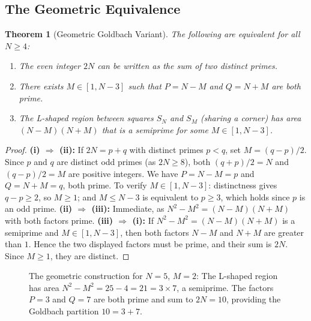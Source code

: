 \documentclass[11pt]{amsart}
\newtheorem{Theorem}{Theorem}[section]
\theoremstyle{definition}
\theoremstyle{remark}
\begin{document}
\subsection{The Geometric Equivalence}
\begin{Theorem}[Geometric Goldbach Variant]\label{thm:geometric}
The following are equivalent for all $N \geq 4$:
\begin{enumerate}
\item[\emph{(i)}] The even integer $2N$ can be written as the sum of two distinct primes.
\item[\emph{(ii)}] There exists $M \in [1, N-3]$ such that $P = N - M$ and $Q = N + M$ are both prime.
\item[\emph{(iii)}] The L-shaped region between squares $S_N$ and $S_M$ (sharing a corner) has area $(N-M)(N+M)$ that is a semiprime for some $M \in [1, N-3]$.
\end{enumerate}
\end{Theorem}
\begin{proof}
\textbf{(i) $\Rightarrow$ (ii):} If $2N = p + q$ with distinct primes $p < q$, set $M = (q-p)/2$. Since $p$ and $q$ are distinct odd primes (as $2N \geq 8$), both $(q+p)/2 = N$ and $(q-p)/2 = M$ are positive integers. We have $P = N - M = p$ and $Q = N + M = q$, both prime. To verify $M \in [1, N-3]$: distinctness gives $q - p \geq 2$, so $M \geq 1$; and $M \leq N - 3$ is equivalent to $p \geq 3$, which holds since $p$ is an odd prime.
\textbf{(ii) $\Rightarrow$ (iii):} Immediate, as $N^2 - M^2 = (N-M)(N+M)$ with both factors prime.
\textbf{(iii) $\Rightarrow$ (i):} If $N^2 - M^2=(N-M)(N+M)$ is a semiprime and $M \in [1, N-3]$, then both factors $N-M$ and $N+M$ are greater than $1$. Hence the two displayed factors must be prime, and their sum is $2N$. Since $M\geq 1$, they are distinct.
\end{proof}
\begin{figure}[H]
\centering
{}
\caption{The geometric construction for $N=5$, $M=2$: The L-shaped region has area $N^2 - M^2 = 25 - 4 = 21 = 3 \times 7$, a semiprime. The factors $P=3$ and $Q=7$ are both prime and sum to $2N=10$, providing the Goldbach partition $10 = 3 + 7$.}
\label{fig:geometric}
\end{figure}
\end{document}
